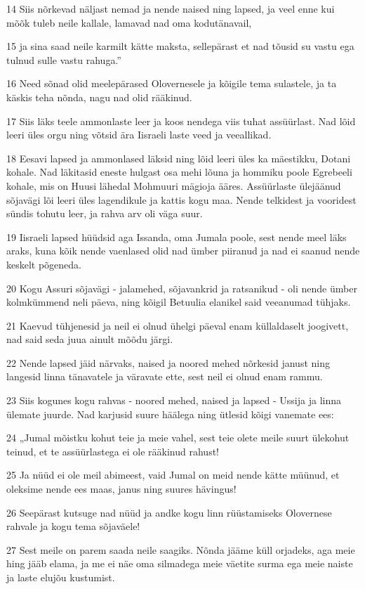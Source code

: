 \par 14 Siis nõrkevad näljast nemad ja nende naised ning lapsed, ja veel enne kui mõõk tuleb neile kallale, lamavad nad oma kodutänavail,
\par 15 ja sina saad neile karmilt kätte maksta, sellepärast et nad tõusid su vastu ega tulnud sulle vastu rahuga.”
\par 16 Need sõnad olid meelepärased Olovernesele ja kõigile tema sulastele, ja ta käskis teha nõnda, nagu nad olid rääkinud.
\par 17 Siis läks teele ammonlaste leer ja koos nendega viis tuhat assüürlast. Nad lõid leeri üles orgu ning võtsid ära Iisraeli laste veed ja veeallikad.
\par 18 Eesavi lapsed ja ammonlased läksid ning lõid leeri üles ka mäestikku, Dotani kohale. Nad läkitasid eneste hulgast osa mehi lõuna ja hommiku poole Egrebeeli kohale, mis on Huusi lähedal Mohmuuri mägioja ääres. Assüürlaste ülejäänud sõjavägi lõi leeri üles lagendikule ja kattis kogu maa. Nende telkidest ja vooridest sündis tohutu leer, ja rahva arv oli väga suur.
\par 19 Iisraeli lapsed hüüdsid aga Issanda, oma Jumala poole, sest nende meel läks araks, kuna kõik nende vaenlased olid nad ümber piiranud ja nad ei saanud nende keskelt põgeneda.
\par 20 Kogu Assuri sõjavägi - jalamehed, sõjavankrid ja ratsanikud - oli nende ümber kolmkümmend neli päeva, ning kõigil Betuulia elanikel said veeanumad tühjaks.
\par 21 Kaevud tühjenesid ja neil ei olnud ühelgi päeval enam küllaldaselt joogivett, nad said seda juua ainult mõõdu järgi.
\par 22 Nende lapsed jäid närvaks, naised ja noored mehed nõrkesid janust ning langesid linna tänavatele ja väravate ette, sest neil ei olnud enam rammu.
\par 23 Siis kogunes kogu rahvas - noored mehed, naised ja lapsed - Ussija ja linna ülemate juurde. Nad karjusid suure häälega ning ütlesid kõigi vanemate ees:
\par 24 „Jumal mõistku kohut teie ja meie vahel, sest teie olete meile suurt ülekohut teinud, et te assüürlastega ei ole rääkinud rahust!
\par 25 Ja nüüd ei ole meil abimeest, vaid Jumal on meid nende kätte müünud, et oleksime nende ees maas, janus ning suures hävingus!
\par 26 Seepärast kutsuge nad nüüd ja andke kogu linn rüüstamiseks Olovernese rahvale ja kogu tema sõjaväele!
\par 27 Sest meile on parem saada neile saagiks. Nõnda jääme küll orjadeks, aga meie hing jääb elama, ja me ei näe oma silmadega meie väetite surma ega meie naiste ja laste elujõu kustumist.
